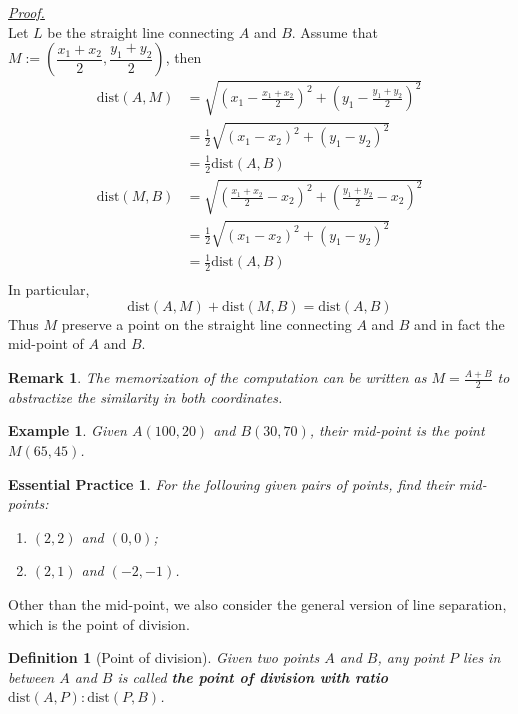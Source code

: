 \documentclass[12pt]{article}
\newtheorem{definition}{Definition}[section]
\newtheorem*{remark}{Remark}
\newtheorem*{example}{Example}
\newtheorem{exercise}{Essential Practice}[subsection]
\renewenvironment{proof}[1][Proof]{\begin{snugshade*} \underline{\textit{{#1}.}}\\}{\hfill \qedsymbol \end{snugshade*}}
\begin{document}
    \begin{proof}
        Let $L$ be the straight line connecting $A$ and $B$. Assume that $M:=(\dfrac{x_1+x_2}{2},\dfrac{y_1+y_2}{2})$, then\begin{align*}
            \mathrm{dist}(A,M)&=\sqrt{(x_1-\frac{x_1+x_2}{2})^2+(y_1-\frac{y_1+y_2}{2})^2}\\
            &=\frac{1}{2}\sqrt{(x_1-x_2)^2+(y_1-y_2)^2}\\
            &=\frac{1}{2}\mathrm{dist}(A,B)\\
            \mathrm{dist}(M,B)&=\sqrt{(\frac{x_1+x_2}{2}-x_2)^2+(\frac{y_1+y_2}{2}-x_2)^2}\\
            &=\frac{1}{2}\sqrt{(x_1-x_2)^2+(y_1-y_2)^2}\\
            &=\frac{1}{2}\mathrm{dist}(A,B)\\
        \end{align*}
        In particular, $$\mathrm{dist}(A,M)+\mathrm{dist}(M,B)=\mathrm{dist}(A,B)$$
        Thus $M$ preserve a point on the straight line connecting $A$ and $B$ and in fact the mid-point of $A$ and $B$.
    \end{proof}

    \begin{remark}
        The memorization of the computation can be written as $M=\frac{A+B}{2}$ to abstractize the similarity in both coordinates.
    \end{remark}

    \begin{example}
        Given $A(100,20)$ and $B(30,70)$, their mid-point is the point $M(65,45)$.
    \end{example}

    \begin{exercise}
        For the following given pairs of points, find their mid-points:\begin{enumerate}
            \item $(2,2)$ and $(0,0)$;
            \item $(2,1)$ and $(-2,-1)$.
        \end{enumerate}
    \end{exercise}

    Other than the mid-point, we also consider the general version of line separation, which is the point of division.

    \begin{definition}[Point of division]
        Given two points $A$ and $B$, any point $P$ lies in between $A$ and $B$ is called \textbf{the point of division with ratio $\mathrm{dist}(A,P):\mathrm{dist}(P,B)$}.
    \end{definition}
\end{document}
